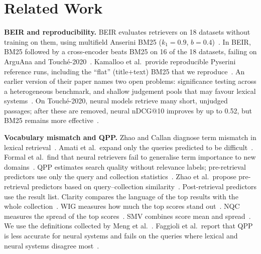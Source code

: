 \documentclass[conference]{IEEEtran}
\makeatletter
\newcommand{\ndcg}{nDCG@10}
\makeatother
\begin{document}
\section{Related Work}
\textbf{BEIR and reproducibility.} BEIR evaluates retrievers on 18 datasets without training on them, using multifield Anserini BM25 ($k_1=0.9$, $b=0.4$)~\cite{thakur2021beir}. In BEIR, BM25 followed by a cross-encoder beats BM25 on 16 of the 18 datasets, failing on ArguAna and Touch\'e-2020~\cite{thakur2021beir}. Kamalloo et al.\ provide reproducible Pyserini reference runs, including the ``flat'' (title+text) BM25 that we reproduce~\cite{kamalloo2024resources}. An earlier version of their paper names two open problems: significance testing across a heterogeneous benchmark, and shallow judgement pools that may favour lexical systems~\cite{kamalloo2024resources}. On Touch\'e-2020, neural models retrieve many short, unjudged passages; after these are removed, neural \ndcg{} improves by up to 0.52, but BM25 remains more effective~\cite{thakur2024touche}.

\textbf{Vocabulary mismatch and QPP.} Zhao and Callan diagnose term mismatch in lexical retrieval~\cite{zhao2012automatic}. Amati et al.\ expand only the queries predicted to be difficult~\cite{amati2004query}. Formal et al.\ find that neural retrievers fail to generalise term importance to new domains~\cite{formal2022match}. QPP estimates search quality without relevance labels; pre-retrieval predictors use only the query and collection statistics~\cite{hauff2008survey}. Zhao et al.\ propose pre-retrieval predictors based on query--collection similarity~\cite{zhao2008effective}. Post-retrieval predictors use the result list. Clarity compares the language of the top results with the whole collection~\cite{cronentownsend2002predicting}. WIG measures how much the top scores stand out~\cite{zhou2007query}. NQC measures the spread of the top scores~\cite{shtok2012predicting}. SMV combines score mean and spread~\cite{tao2014query}. We use the definitions collected by Meng et al.~\cite{meng2023qpp}. Faggioli et al.\ report that QPP is less accurate for neural systems and fails on the queries where lexical and neural systems disagree most~\cite{faggioli2023qpp}.
\end{document}

